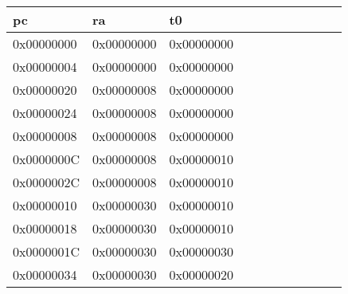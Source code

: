 \begin{blocksection}
\begin{solution}[0.5in]
\begin{tabular}{ |l|l|l|l|l|l|l|l|l|l|l| } 
 \hline
 pc & ra & t0 \\ 
 \hline
 0x00000000 & 0x00000000 & 0x00000000 \\
 \hline
 0x00000004 & 0x00000000 & 0x00000000 \\
 \hline 
 0x00000020 & 0x00000008 & 0x00000000 \\
 \hline
 0x00000024 & 0x00000008 & 0x00000000 \\
 \hline 
 0x00000008 & 0x00000008 & 0x00000000 \\
 \hline
 0x0000000C & 0x00000008 & 0x00000010 \\
 \hline
 0x0000002C & 0x00000008 & 0x00000010 \\
 \hline
 0x00000010 & 0x00000030 & 0x00000010 \\
 \hline
 0x00000018 & 0x00000030 & 0x00000010 \\
 \hline
 0x0000001C & 0x00000030 & 0x00000030 \\
 \hline
 0x00000034 & 0x00000030 & 0x00000020 \\
 \hline
\end{tabular}
\end{solution}

\end{blocksection}
